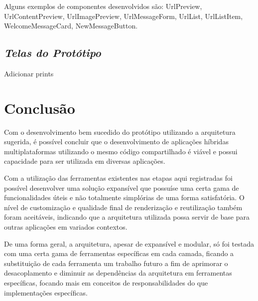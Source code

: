 Alguns exemplos de componentes desenvolvidos são: UrlPreview, UrlContentPreview, UrlImagePreview, UrlMessageForm, UrlList,  UrlListItem, WelcomeMessageCard, NewMessageButton.

\subsection{{\it Telas do Protótipo}}
Adicionar prints

\section{\esp Conclusão}

Com o desenvolvimento bem sucedido do protótipo utilizando a arquitetura sugerida, é possível concluir que o desenvolvimento de aplicações híbridas multiplataformas utilizando o mesmo código compartilhado é viável e possui capacidade para ser utilizada em diversas aplicações.

Com a utilização das ferramentas existentes nas etapas aqui registradas foi possível desenvolver uma solução expansível que possuíse uma certa gama de funcionalidades úteis e não totalmente simplórias de uma forma satisfatória. O nível de customização e qualidade final de renderização e reutilização também foram aceitáveis, indicando que a arquitetura utilizada possa servir de base para outras aplicações em variados contextos.

De uma forma geral, a arquitetura, apesar de expansível e modular, só foi testada com uma certa gama de ferramentas específicas em cada camada, ficando a substituição de cada ferramenta um trabalho futuro a fim de aprimorar o desacoplamento e diminuir as dependências da arquitetura em ferramentas específicas, focando mais em conceitos de responsabilidades do que implementações específicas.
